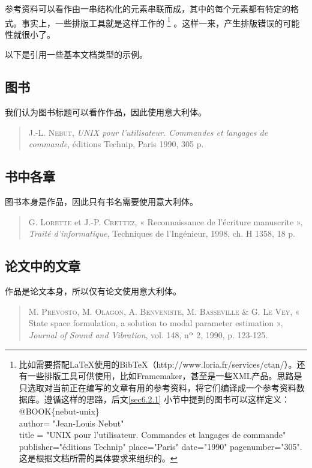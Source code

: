 参考资料可以看作由一串结构化的元素串联而成，其中的每个元素都有特定的格式。事实上，一些排版工具就是这样工作的
    \footnote{比如需要搭配\LaTeX 使用的Bib\TeX（http://www.loria.fr/services/ctan/）。还有一些排版工具可供使用，比如Framemaker，甚至是一些XML产品。思路是只选取对当前正在编写的文章有用的参考资料，将它们编译成一个参考资料数据库。遵循这样的思路，后文\ref{sec6.2.1}%
    小节中提到的图书可以这样定义：\\
    {\ttfamily 
    @BOOK\{nebut-unix\}\\
    author= "Jean-Louis Nebut"\\
    title = "UNIX pour l'utilisateur. Commandes et langages de commande"\\
    publisher="éditions Technip" place="Paris" date="1990" pagenumber="305".\\
    }
    这是根据文档所需的具体要求来组织的。}
。这样一来，产生排版错误的可能性就很小了。

以下是引用一些基本文档类型的示例。

\subsection{图书}

我们认为图书标题可以看作作品，因此使用意大利体。

\begin{quote}
    J.-L. \textsc{Nebut}, \emph{UNIX pour l'utilisateur. Commandes et langages de commande}, éditions Technip, Paris 1990, 305 p.
\end{quote}

\subsection{书中各章}

图书本身是作品，因此只有书名需要使用意大利体。

\begin{quote}
    G. \textsc{Lorette} et J.-P. \textsc{Crettez}, « Reconnaissance de l'écriture manuscrite », \emph{Traité d'informatique}, Techniques de l'Ingénieur, 1998, ch. H 1358, 18 p.
\end{quote}

\subsection{论文中的文章}

作品是论文本身，所以仅有论文使用意大利体。

\begin{quote}
    M. \textsc{Prevosto}, M. \textsc{Olagon}, A. \textsc{Benveniste}, M. \textsc{Basseville} \& G. \textsc{Le Vey}, « State space formulation, a solution to modal parameter estimation », \emph{Journal of Sound and Vibration}, vol. 148, n$^{\rm o}$ 2, 1990, p. 123-125.
\end{quote}

